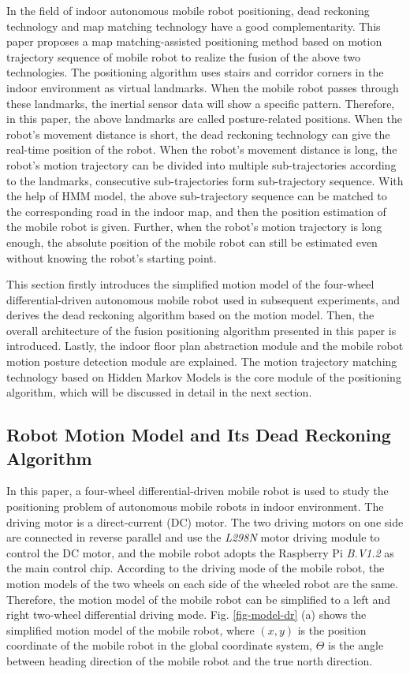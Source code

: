 \documentclass{llncs}
\begin{document}
In the field of indoor autonomous mobile robot positioning, dead reckoning technology and map matching technology have a good complementarity. This paper proposes a map matching-assisted positioning method based on motion trajectory sequence of mobile robot to realize the fusion of the above two technologies. The positioning algorithm uses stairs and corridor corners in the indoor environment as virtual landmarks. When the mobile robot passes through these landmarks, the inertial sensor data will show a specific pattern. Therefore, in this paper, the above landmarks are called posture-related positions. When the robot's movement distance is short, the dead reckoning technology can give the real-time position of the robot. When the robot's movement distance is long, the robot's motion trajectory can be divided into multiple sub-trajectories according to the landmarks, consecutive sub-trajectories form sub-trajectory sequence. With the help of HMM model, the above sub-trajectory sequence can be matched to the corresponding road in the indoor map, and then the position estimation of the mobile robot is given. Further, when the robot's motion trajectory is long enough, the absolute position of the mobile robot can still be estimated even without knowing the robot's starting point.

This section firstly introduces the simplified motion model of the four-wheel differential-driven autonomous mobile robot used in subsequent experiments, and derives the dead reckoning algorithm based on the motion model. Then, the overall architecture of the fusion positioning algorithm presented in this paper is introduced. Lastly, the indoor floor plan abstraction module and the mobile robot motion posture detection module are explained. The motion trajectory matching technology based on Hidden Markov Models is the core module of the positioning algorithm, which will be discussed in detail in the next section.

\subsection{Robot Motion Model and Its Dead Reckoning Algorithm}

In this paper, a four-wheel differential-driven mobile robot is used to study the positioning problem of autonomous mobile robots in indoor environment. The driving motor is a direct-current (DC) motor. The two driving motors on one side are connected in reverse parallel and use the \emph{L298N} motor driving module to control the DC motor, and the mobile robot adopts the Raspberry Pi \emph{B.V1.2} as the main control chip. According to the driving mode of the mobile robot, the motion models of the two wheels on each side of the wheeled robot are the same. Therefore, the motion model of the mobile robot can be simplified to a left and right two-wheel differential driving mode. Fig. \ref{fig-model-dr} (a) shows the simplified motion model of the mobile robot, where $(x, y)$ is the position coordinate of the mobile robot in the global coordinate system, $\Theta$ is the angle between heading direction of the mobile robot and the true north direction.
\end{document}
